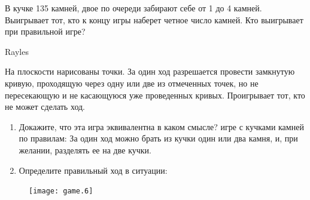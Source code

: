 \begin{problem}
В кучке 135 камней, двое по очереди забирают себе от 1 до 4 камней. Выигрывает тот, кто к концу игры наберет четное число камней. Кто выигрывает при правильной игре?\par

\begin{sol}
\end{sol}
\end{problem}













\begin{problem}
\begin{source} Rayles\end{source}
 \label{Rayles}
На плоскости нарисованы точки. За один ход разрешается провести замкнутую кривую, проходящую через одну или две из отмеченных точек, но не пересекающую и не касающуюся уже проведенных кривых. Проигрывает тот, кто не может сделать ход.\par
\begin{enumerate}
\item 	Докажите, что эта игра эквивалентна {\red в каком смысле?} игре с кучками камней по правилам: За один ход можно брать из кучки один или два камня, и, при желании, разделять ее на две кучки.\par
\item 	Определите правильный ход в ситуации:\par
\end{enumerate}
\begin{figure}[htbp]
     \texttt{[image: game.6]}
\end{figure}



\begin{sol}

\end{sol}
\end{problem}

